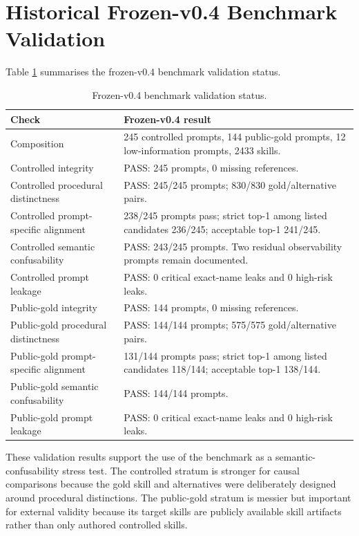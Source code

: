 \section{Historical Frozen-v0.4 Benchmark Validation}

Table \ref{tab:validation-status-v04} summarises the frozen-v0.4 benchmark validation status.

\begin{table}[h]
\centering
\small
\begin{tabular}{p{}p{}}
\toprule
Check & Frozen-v0.4 result \\
\midrule
Composition & 245 controlled prompts, 144 public-gold prompts, 12 low-information prompts, 2433 skills. \\
Controlled integrity & PASS: 245 prompts, 0 missing references. \\
Controlled procedural distinctness & PASS: 245/245 prompts; 830/830 gold/alternative pairs. \\
Controlled prompt-specific alignment & 238/245 prompts pass; strict top-1 among listed candidates 236/245; acceptable top-1 241/245. \\
Controlled semantic confusability & PASS: 243/245 prompts. Two residual observability prompts remain documented. \\
Controlled prompt leakage & PASS: 0 critical exact-name leaks and 0 high-risk leaks. \\
Public-gold integrity & PASS: 144 prompts, 0 missing references. \\
Public-gold procedural distinctness & PASS: 144/144 prompts; 575/575 gold/alternative pairs. \\
Public-gold prompt-specific alignment & 131/144 prompts pass; strict top-1 among listed candidates 118/144; acceptable top-1 138/144. \\
Public-gold semantic confusability & PASS: 144/144 prompts. \\
Public-gold prompt leakage & PASS: 0 critical exact-name leaks and 0 high-risk leaks. \\
\bottomrule
\end{tabular}
\caption{Frozen-v0.4 benchmark validation status.}
\label{tab:validation-status-v04}
\end{table}

These validation results support the use of the benchmark as a semantic-confusability stress test. The controlled stratum is stronger for causal comparisons because the gold skill and alternatives were deliberately designed around procedural distinctions. The public-gold stratum is messier but important for external validity because its target skills are publicly available skill artifacts rather than only authored controlled skills.

